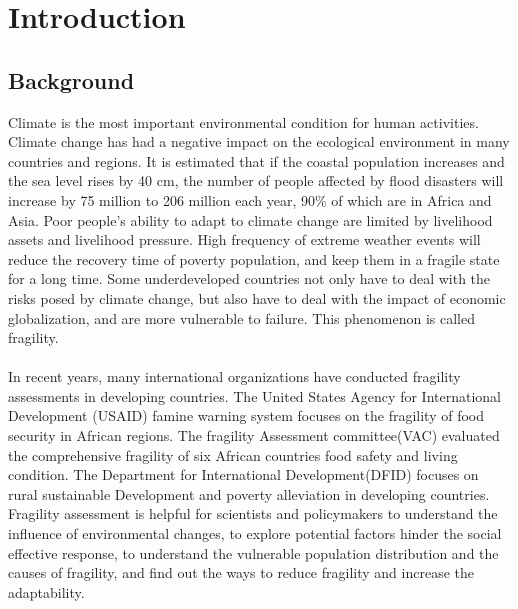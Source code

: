 \documentclass{mcmthesis}
\begin{document}
\newpage
\section{Introduction}
\subsection{Background}
Climate is the most important environmental condition for human activities.
Climate change has had a negative impact on the ecological environment in 
many countries and regions. It is estimated that if the coastal population 
increases and the sea level rises by 40 cm, the number of people affected by 
flood disasters will increase by 75 million to 206 million each year, 90\% of
which are in Africa and Asia. Poor people's ability to adapt to climate change 
are limited by livelihood assets and livelihood pressure. High frequency of
extreme weather events will reduce the recovery time of poverty population, 
and keep them in a fragile state for a long time. Some underdeveloped 
countries not only have to deal with the risks posed by climate change, 
but also have to deal with the impact of economic globalization, 
and are more vulnerable to failure. This phenomenon is called fragility.\\\\
In recent years, many international organizations have conducted fragility 
assessments in developing countries. The United States Agency for International
Development (USAID) famine warning system focuses on the fragility of 
food security in African regions. The fragility Assessment committee(VAC) 
evaluated the comprehensive fragility of six African countries food safety 
and living condition. The Department for International Development(DFID)
focuses on rural sustainable Development and poverty alleviation in developing
countries. Fragility assessment is helpful for scientists and 
policymakers to understand the influence of environmental changes, 
to explore potential factors hinder the social effective response, 
to understand the vulnerable population distribution and the causes 
of fragility, and find out the ways to reduce fragility and 
increase the adaptability.
\end{document}
